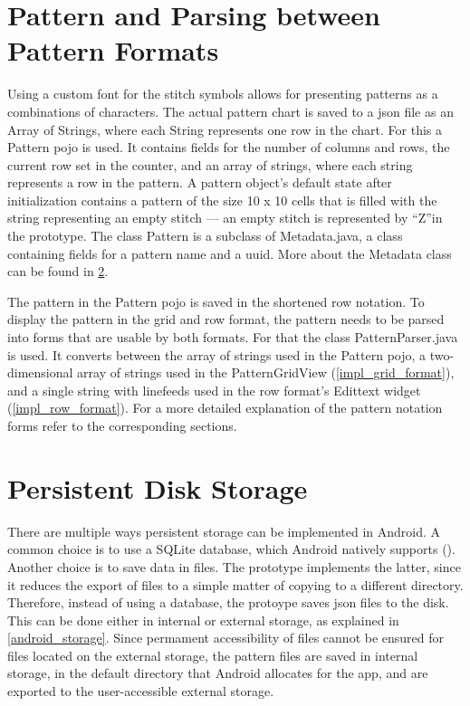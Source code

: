 \section{Pattern and Parsing between Pattern Formats}
Using a custom font for the stitch symbols allows for presenting patterns as a combinations of characters. The actual pattern chart is saved to a \gls{json} file as an Array of Strings, where each String represents one row in the chart. For this a Pattern \gls{pojo} is used. It contains fields for the number of columns and rows, the current row set in the counter, and an array of strings, where each string represents a row in the pattern. A pattern object’s default state after initialization contains a pattern of the size 10 x 10  cells that is filled with the string representing an empty stitch --- an empty stitch is represented by ``Z''in the prototype. The class Pattern is a subclass of Metadata.java, a class containing fields for a pattern name and a \gls{uuid}. More about the Metadata class can be found in \ref{implementation_storage}.

The pattern in the Pattern \gls{pojo} is saved in the shortened row notation. To display the pattern in the grid and row format, the pattern needs to be parsed into forms that are usable by both formats. For that the class PatternParser.java is used. It converts between the array of strings used in the Pattern \gls{pojo}, a two-dimensional array of strings used in the PatternGridView (\ref{impl_grid_format}), and a single string with linefeeds used in the row format's Edittext widget (\ref{impl_row_format}). For a more detailed explanation of the pattern notation forms refer to the corresponding sections.

\section{Persistent Disk Storage}
\label{implementation_storage}
There are multiple ways persistent storage can be implemented in Android. A common choice is to use a SQLite database, which Android natively supports (\cite{android_saving_data}). Another choice is to save data in files. The prototype implements the latter, since it reduces the export of files to a simple matter of copying to a different directory. Therefore, instead of using a database, the protoype saves \gls{json} files to the disk. This can be done either in internal or external storage, as explained in \ref{android_storage}. Since permament accessibility of files cannot be ensured for files located on the external storage, the pattern files are saved in internal storage, in the default directory that Android allocates for the app, and are exported to the user-accessible external storage. 

